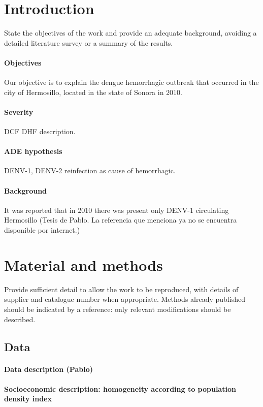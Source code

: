 \documentclass[draft, openbib]{imammb}
\numberwithin{equation}{section}
\begin{document}
    \section{Introduction} \label{intro}
        State the objectives of the work and provide an adequate 
        background, avoiding a detailed literature survey or a 
        summary of the results.

        \paragraph{Objectives}
        Our objective is to explain the dengue hemorrhagic outbreak that 
     occurred in the city of Hermosillo, located in the state of Sonora in 2010.
    \paragraph{Severity}
    \ac{DCF} 
    \ac{DHF} description.
    \paragraph{ADE hypothesis}
     \ac{DENV-1}, \ac{DENV-2}
     reinfection as cause of hemorrhagic.
        \paragraph{Background}
            It was reported that in 2010 there was present only DENV-1 circulating
        Hermosillo (Tesis de Pablo. La referencia que menciona ya no se encuentra
        disponible por internet.)  
        \section{Material and methods}
        Provide sufficient detail to allow the work to be 
        reproduced, with details of supplier and catalogue 
        number when appropriate. Methods already published 
        should be indicated by a reference: only relevant 
        modifications should be described.
        \subsection{Data}
            \label{sec:Intro}
            \paragraph{Data description (Pablo)}
            \paragraph{Socioeconomic description: 
                homogeneity according to population density index}
\end{document}
